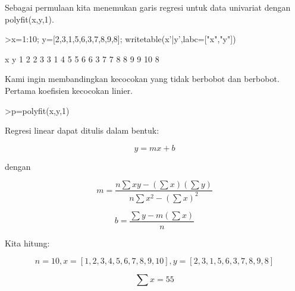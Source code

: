 \documentclass[a4paper,10pt]{article}
\begin{document}
\begin{eulernotebook}
\begin{eulercomment}
\begin{eulercomment}
\begin{eulercomment}
Sebagai permulaan kita menemukan garis regresi untuk data univariat
dengan polyfit(x,y,1).
\end{eulercomment}
\begin{eulerprompt}
>x=1:10; y=[2,3,1,5,6,3,7,8,9,8]; writetable(x'|y',labc=["x","y"])
\end{eulerprompt}
\begin{euleroutput}
           x         y
           1         2
           2         3
           3         1
           4         5
           5         6
           6         3
           7         7
           8         8
           9         9
          10         8
\end{euleroutput}
\begin{eulercomment}
Kami ingin membandingkan kecocokan yang tidak berbobot dan berbobot.
Pertama koefisien kecocokan linier.
\end{eulercomment}
\begin{eulerprompt}
>p=polyfit(x,y,1)
\end{eulerprompt}
\begin{euleroutput}
  [0.733333,  0.812121]
\end{euleroutput}
\begin{eulercomment}
Regresi linear dapat ditulis dalam bentuk:\\
\end{eulercomment}
\begin{eulerformula}
\[
y=mx + b
\]
\end{eulerformula}
\begin{eulercomment}
dengan\\
\end{eulercomment}
\begin{eulerformula}
\[
m = \frac{n \sum xy - (\sum x)(\sum y)}{n \sum x^2 - (\sum x)^2}
\]
\end{eulerformula}
\begin{eulerformula}
\[
b = \frac{\sum y - m (\sum x)}{n}
\]
\end{eulerformula}
\begin{eulercomment}
Kita hitung:\\
\end{eulercomment}
\begin{eulerformula}
\[
n = 10, x=[1,2,3,4,5,6,7,8,9,10], y=[2,3,1,5,6,3,7,8,9,8]
\]
\end{eulerformula}
\begin{eulerformula}
\[
\sum x = 55
\]
\end{eulerformula}
\begin{eulerformula}

\end{eulerformula}
\end{eulercomment}
\end{eulercomment}
\end{eulernotebook}
\end{document}
